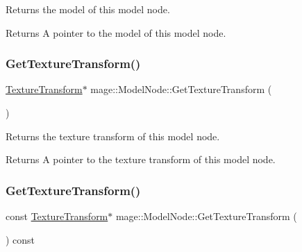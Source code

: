 Returns the model of this model node.

\begin{DoxyReturn}{Returns}
A pointer to the model of this model node. 
\end{DoxyReturn}
\hypertarget{classmage_1_1_model_node_aa5b732d1ad0f3d2ff8549731708fd63c}{}\label{classmage_1_1_model_node_aa5b732d1ad0f3d2ff8549731708fd63c} 
\subsubsection{\texorpdfstring{Get\+Texture\+Transform()}{GetTextureTransform()}\hspace{0.1cm}{\footnotesize\ttfamily [1/2]}}
{\footnotesize\ttfamily \hyperlink{classmage_1_1_texture_transform}{Texture\+Transform}$\ast$ mage\+::\+Model\+Node\+::\+Get\+Texture\+Transform (\begin{DoxyParamCaption}{ }\end{DoxyParamCaption})\hspace{0.3cm}{\ttfamily [noexcept]}}

Returns the texture transform of this model node.

\begin{DoxyReturn}{Returns}
A pointer to the texture transform of this model node. 
\end{DoxyReturn}
\hypertarget{classmage_1_1_model_node_a3686306f587abaa353450c45dd508dc4}{}\label{classmage_1_1_model_node_a3686306f587abaa353450c45dd508dc4} 
\subsubsection{\texorpdfstring{Get\+Texture\+Transform()}{GetTextureTransform()}\hspace{0.1cm}{\footnotesize\ttfamily [2/2]}}
{\footnotesize\ttfamily const \hyperlink{classmage_1_1_texture_transform}{Texture\+Transform}$\ast$ mage\+::\+Model\+Node\+::\+Get\+Texture\+Transform (\begin{DoxyParamCaption}{ }\end{DoxyParamCaption}) const\hspace{0.3cm}{\ttfamily [noexcept]}}

